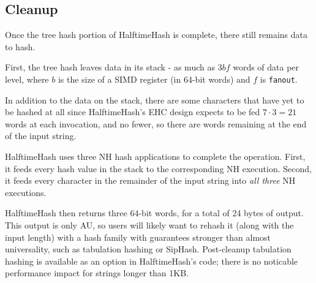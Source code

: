 \documentclass[sigconf, nonacm]{acmart}
\begin{document}




\subsection{Cleanup}

Once the tree hash portion of HalftimeHash is complete, there still remains data to hash.

First, the tree hash leaves data in its stack - as much as $3bf$ words of data per level, where $b$ is the size of a SIMD register (in 64-bit words) and $f$ is \texttt{fanout}.

In addition to the data on the stack, there are some characters that have yet to be hashed at all since HalftimeHash's EHC design expects to be fed $7 \cdot 3 = 21$ words at each invocation, and no fewer, so there are words remaining at the end of the input string.

HalftimeHash uses three NH hash applications to complete the operation.
First, it feeds every hash value in the stack to the corresponding NH execution.
Second, it feeds every character in the remainder of the input string into {\em all three} NH executions.

HalftimeHash then returns three 64-bit words, for a total of 24 bytes of output.
This output is only AU, so users will likely want to rehash it (along with the input length) with a hash family with guarantees stronger than almost universality, such as tabulation hashing or SipHash. \cite{tabulation,siphash}
Post-cleanup tabulation hashing is available as an option in HalftimeHash's code; there is no noticable performance impact for strings longer than 1KB.


\end{document}
